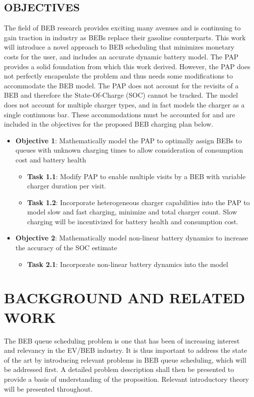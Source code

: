 \documentclass[ee,thesis]{usuthesis}
\begin{document}
\section{OBJECTIVES}
\label{sec:objectives}
The field of BEB research provides exciting many avenues and is continuing to gain traction in industry as BEBs replace
their gasoline counterparts. This work will introduce a novel approach to BEB scheduling that minimizes monetary costs
for the user, and includes an accurate dynamic battery model. The PAP provides a solid foundation from which this work
derived. However, the PAP does not perfectly encapsulate the problem and thus needs some modifications to accommodate
the BEB model. The PAP does not account for the revisits of a BEB and therefore the State-Of-Charge (SOC) cannot be
tracked. The model does not account for multiple charger types, and in fact models the charger as a single continuous
bar. These accommodations must be accounted for and are included in the objectives for the proposed BEB charging plan
below.

\begin{itemize}
\item \textbf{Objective 1}: Mathematically model the PAP to optimally assign BEBs to queues with unknown charging times to allow consideration of consumption cost and battery health

\begin{itemize}
\item \textbf{Task 1.1}: Modify PAP to enable multiple visits by a BEB with variable charger duration per visit.

\item \textbf{Task 1.2}: Incorporate heterogeneous charger capabilities into the PAP to model slow and fast charging, minimize
and total charger count. Slow charging will be incentivized for battery health and consumption cost.
\end{itemize}

\item \textbf{Objective 2}: Mathematically model non-linear battery dynamics to increase the accuracy of the SOC estimate

\begin{itemize}
\item \textbf{Task 2.1}: Incorporate non-linear battery dynamics into the model
\end{itemize}
\end{itemize}
\chapter{BACKGROUND AND RELATED WORK}
\label{sec:background-and-related-work}
The BEB queue scheduling problem is one that has been of increasing interest and relevancy in the EV/BEB industry. It is
thus important to address the state of the art by introducing relevant problems in BEB queue scheduling, which will be
addressed first. A detailed problem description shall then be presented to provide a basis of understanding of the
proposition. Relevant introductory theory will be presented throughout.
\end{document}
